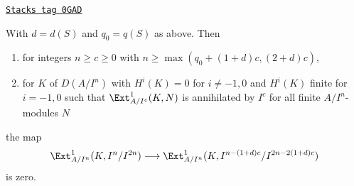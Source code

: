 \begin{lemma}
\label{local-cohomology-lemma-bound-two-term-complex}
\href{https://stacks.math.columbia.edu/tag/0GAD}{\texttt{Stacks tag 0GAD}}

With $d = d(S)$ and $q_0 = q(S)$ as above. Then
\begin{enumerate}
\item for integers $n \geq c \geq 0$ with
$n \geq \max(q_0 + (1 + d)c, (2 + d)c)$,
\item for $K$ of $D(A/I^n)$ with $H^i(K) = 0$ for $i \not = -1, 0$
and $H^i(K)$ finite for $i = -1, 0$ such that $\Ext^1_{A/I^c}(K, N)$
is annihilated by $I^c$ for all finite $A/I^n$-modules $N$
\end{enumerate}
the map
$$
\Ext^1_{A/I^n}(K, I^n/I^{2n})
\longrightarrow
\Ext^1_{A/I^n}(K, I^{n - (1 + d)c}/I^{2n - 2(1 + d)c})
$$
is zero.
\end{lemma}

